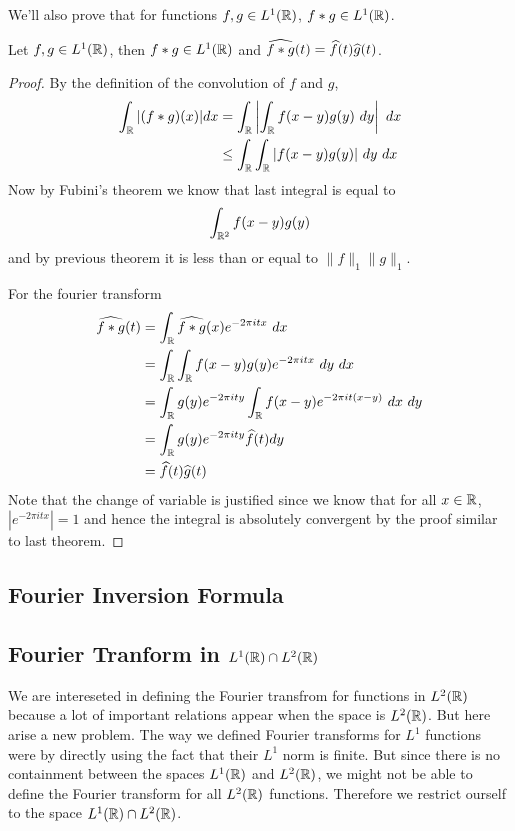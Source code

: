   We'll also prove that for functions $f, g \in L^1(\mathbb R)$, $f*g \in L^1(\mathbb R)$.
  \begin{proposition}
    \label{prop:convolution_is_well_defined_in_L^1(R)}
    Let $f, g \in L^1(\mathbb R)$, then $f*g \in L^1(\mathbb R)$ and $\widehat{f*g}(t) = \widehat{f}(t)\widehat{g}(t)$.
  \end{proposition}
  \begin{proof}
    By the definition of the convolution of $f$ and $g$, 
    \begin{align*}
      \int_\mathbb R|(f*g)(x)| dx &= \int_\mathbb R \left| \int_\mathbb R f(x-y)g(y) \ dy \right| \ dx \\
      & \le \int_\mathbb R \int_\mathbb R |f(x-y)g(y)| \ dy \ dx
    \end{align*}
    Now by Fubini's theorem we know that last integral is equal to $$\int_{\mathbb R^2}f(x-y)g(y) $$ and by previous theorem it is less than or equal to $\|f\|_1\|g\|_1$.

    For the fourier transform
    \begin{align*}
      \widehat{f*g}(t) &= \int_\R \widehat{f*g}(x) e^{-2 \pi itx} \ dx \\
      &= \int_\R \int_\R f(x-y)g(y) e^{-2 \pi itx} \ dy \ dx \\
      &= \int_\R g(y)e^{-2 \pi ity}\int_\R f(x-y) e^{-2 \pi it (x-y)} \ dx \ dy \\
      &= \int_\R g(y)e^{-2 \pi ity} \hatf(t) dy \\
      &= \hatf(t) \hatg(t) \\
    \end{align*}
    Note that the change of variable is justified since we know that  for all $x \in \mathbb R$, $|e^{-2\pi itx}| = 1$ and hence the integral is absolutely convergent by the proof similar to last theorem. 
  \end{proof}


\subsection{Fourier Inversion Formula}

\subsection{Fourier Tranform in $L^1(\mathbb R) \cap 
L^2(\mathbb R)$}
We are intereseted in defining the Fourier transfrom for functions in $L^2(\mathbb R)$ because a lot of important relations appear when the space is $L^2(\mathbb R)$. But here arise a new problem. The way we defined Fourier transforms for $L^1$ functions were by directly using the fact that their $L^1$ norm is finite. But since there is no containment between the spaces $L^1(\mathbb R)$ and $L^2(\mathbb R)$, we might not be able to define the Fourier transform for all $L^2(\mathbb R)$ functions. Therefore we restrict ourself to the space $L^1(\mathbb R) \cap L^2(\mathbb R)$. 


